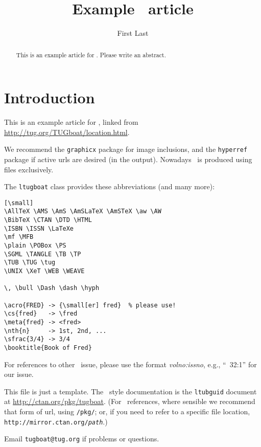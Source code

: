 \documentclass{ltugboat}
\title{Example \TUB\ article}
\author{First Last}
\begin{document}
\maketitle

\begin{abstract}
This is an example article for \TUB{}.
Please write an abstract.
\end{abstract}

\section{Introduction}

This is an example article for \TUB, linked from
\url{http://tug.org/TUGboat/location.html}.

We recommend the \texttt{graphicx} package for image inclusions, and the
\texttt{hyperref} package if active urls are desired (in the 
output).  Nowadays \TUB\ is produced using  files exclusively.

The \texttt{ltugboat} class provides these abbreviations (and many more):

\begin{verbatim}[\small]
\AllTeX \AMS \AmS \AmSLaTeX \AmSTeX \aw \AW
\BibTeX \CTAN \DTD \HTML
\ISBN \ISSN \LaTeXe
\mf \MFB
\plain \POBox \PS
\SGML \TANGLE \TB \TP
\TUB \TUG \tug
\UNIX \XeT \WEB \WEAVE

\, \bull \Dash \dash \hyph

\acro{FRED} -> {\small[er] fred}  % please use!
\cs{fred}   -> \fred
\meta{fred} -> <fred>
\nth{n}     -> 1st, 2nd, ...
\sfrac{3/4} -> 3/4
\booktitle{Book of Fred}
\end{verbatim}

For references to other \TUB\ issue, please use the format
\textsl{volno:issno}, e.g., ``\TUB\ 32:1'' for our  issue.

This file is just a template.  The \TUB\ style documentation is the
\texttt{ltubguid} document at \url{http://ctan.org/pkg/tugboat}.  (For
\CTAN\ references, where sensible we recommend that form of url, using
\texttt{/pkg/}; or, if you need to refer to a specific file location,
\texttt{http://mirror.ctan.org/\textsl{path}}.)

Email \verb|tugboat@tug.org| if problems or questions.

\nocite{book-minimal}      %

\makesignature
\end{document}
